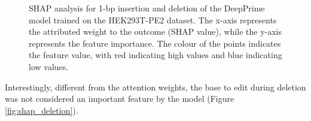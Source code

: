 \begin{figure}
    \caption[SHAP analysis for 1-bp insertion and deletion of the DeepPrime model trained on the HEK293T-PE2 dataset]{SHAP analysis for 1-bp insertion and deletion of the DeepPrime model trained on the HEK293T-PE2 dataset. The x-axis represents the attributed weight to the outcome (SHAP value), while the y-axis represents the feature importance. The colour of the points indicates the feature value, with red indicating high values and blue indicating low values.}
    \label{fig:shap-1bp}
\end{figure}

Interestingly, different from the attention weights, the base to edit during deletion was not considered an important feature by the model (Figure \ref{fig:shap_deletion}). 
